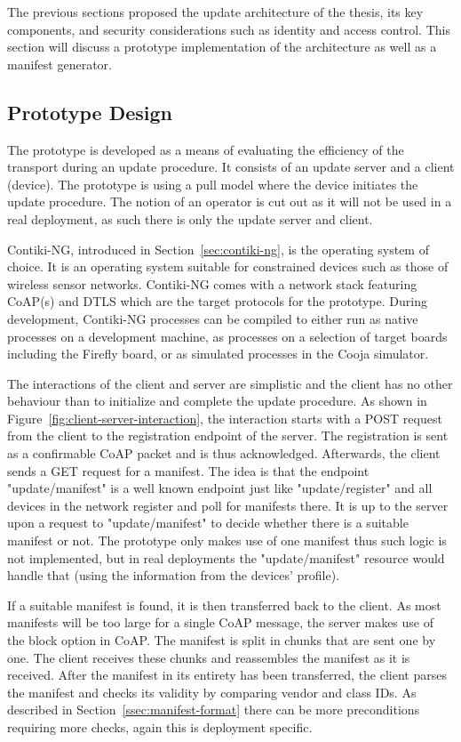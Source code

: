 \documentclass[0-thesis.tex]{subfiles}
\begin{document}
The previous sections proposed the update architecture of the thesis, its key components,
and security considerations such as identity and access control. This section will discuss
a prototype implementation of the architecture as well as a manifest generator. 

\subsection{Prototype Design}
The prototype is developed as a means of evaluating the efficiency of the transport during
an update procedure. It consists of an update server and a client (device). The prototype
is using a pull model where the device initiates the update procedure. The notion of an
operator is cut out as it will not be used in a real deployment, as such there is only the
update server and client.

Contiki-NG, introduced in Section~\ref{sec:contiki-ng}, is the operating system of choice.
It is an operating system suitable for constrained devices such as those of wireless
sensor networks. Contiki-NG comes with a network stack featuring CoAP(s) and DTLS which
are the target protocols for the prototype. During development, Contiki-NG processes can
be compiled to either run as native processes on a development machine, as processes on a
selection of target boards including the Firefly board, or as simulated processes in the
Cooja simulator.

The interactions of the client and server are simplistic and the client has no other
behaviour than to initialize and complete the update procedure. As shown in
Figure~\ref{fig:client-server-interaction}, the interaction starts with a POST request
from the client to the registration endpoint of the server. The registration is sent as a
confirmable CoAP packet and is thus acknowledged. Afterwards, the client sends a GET
request for a manifest. The idea is that the endpoint "update/manifest" is a well known
endpoint just like "update/register" and all devices in the network register and poll for
manifests there. It is up to the server upon a request to "update/manifest" to decide
whether there is a suitable manifest or not. The prototype only makes use of one manifest
thus such logic is not implemented, but in real deployments the "update/manifest" resource
would handle that (using the information from the devices' profile).

If a suitable manifest is found, it is then transferred back to the client. As most
manifests will be too large for a single CoAP message, the server makes use of the block
option in CoAP. The manifest is split in chunks that are sent one by one. The client
receives these chunks and reassembles the manifest as it is received. After the manifest
in its entirety has been transferred, the client parses the manifest and checks its
validity by comparing vendor and class IDs. As described in
Section~\ref{ssec:manifest-format} there can be more preconditions requiring more checks,
again this is deployment specific. 
\end{document}
